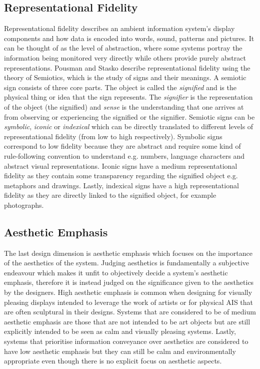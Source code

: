\subsection{Representational Fidelity}
Representational fidelity describes an ambient information system’s display components and how data is encoded into words, sound, patterns and pictures. It can be thought of as the level of abstraction, where some systems portray the information being monitored very directly while others provide purely abstract representations. Pousman and Stasko describe representational fidelity using the theory of Semiotics, which is the study of signs and their meanings. A semiotic sign consists of three core parts. The object is called the \emph{signified} and is the physical thing or idea that the sign represents. The \emph{signifier} is the representation of the object (the signified) and \emph{sense} is the understanding that one arrives at from observing or experiencing the signified or the signifier. Semiotic signs can be \emph{symbolic}, \emph{iconic} or \emph{indexical} which can be directly translated to different levels of representational fidelity (from low to high respectively). Symbolic signs correspond to low fidelity because they are abstract and require some kind of rule-following convention to understand e.g. numbers, language characters and abstract visual representations. Iconic signs have a medium representational fidelity as they contain some transparency regarding the signified object e.g. metaphors and drawings. Lastly, indexical signs have a high representational fidelity as they are directly linked to the signified object, for example photographs.

\subsection{Aesthetic Emphasis}
The last design dimension is aesthetic emphasis which focuses on the importance of the aesthetics of the system. Judging aesthetics is fundamentally a subjective endeavour which makes it unfit to objectively decide a system’s aesthetic emphasis, therefore it is instead judged on the significance given to the aesthetics by the designers. High aesthetic emphasis is common when designing for visually pleasing displays intended to leverage the work of artists or for physical AIS that are often sculptural in their designs. Systems that are considered to be of medium aesthetic emphasis are those that are not intended to be art objects but are still explicitly intended to be seen as calm and visually pleasing systems. Lastly, systems that prioritise information conveyance over aesthetics are considered to have low aesthetic emphasis but they can still be calm and environmentally appropriate even though there is no explicit focus on aesthetic aspects.

